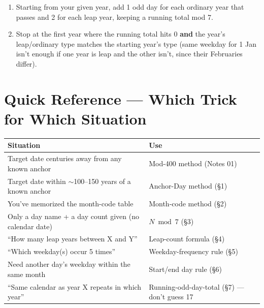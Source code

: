 \documentclass[11pt]{article}
\begin{document}
\begin{formulabox}
\begin{enumerate}[leftmargin=1.6em]
  \item Starting from your given year, add 1 odd day for each ordinary year that passes and 2 for
    each leap year, keeping a running total mod 7.
  \item Stop at the first year where the running total hits 0 \textbf{and} the year's leap/ordinary
    type matches the starting year's type (same weekday for 1 Jan isn't enough if one year is leap
    and the other isn't, since their Februaries differ).
\end{enumerate}
\end{formulabox}

\section{Quick Reference --- Which Trick for Which Situation}

\begin{center}
\begin{tabular}{p{7.7cm}l}
\toprule
\textbf{Situation} & \textbf{Use} \\
\midrule
Target date centuries away from any known anchor & Mod-400 method (Notes 01) \\
Target date within $\sim$100--150 years of a known anchor & Anchor-Day method (\S1) \\
You've memorized the month-code table & Month-code method (\S2) \\
Only a day name + a day count given (no calendar date) & $N \bmod 7$ (\S3) \\
``How many leap years between X and Y'' & Leap-count formula (\S4) \\
``Which weekday(s) occur 5 times'' & Weekday-frequency rule (\S5) \\
Need another day's weekday within the same month & Start/end day rule (\S6) \\
``Same calendar as year X repeats in which year'' & Running-odd-day-total (\S7) --- don't guess 17 \\
\bottomrule
\end{tabular}
\end{center}
\end{document}
